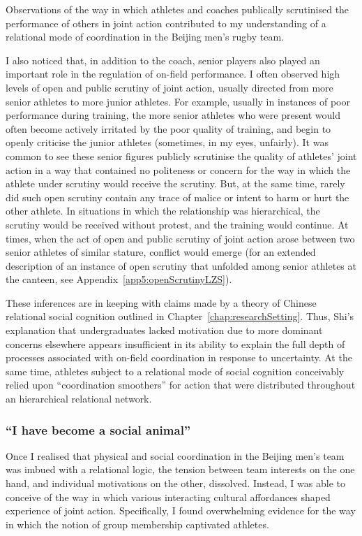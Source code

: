 \begin{CJK}{UTF8}{gbsn}
Observations of the way in which athletes and coaches publically  scrutinised the performance of others in joint action contributed to my understanding of a relational mode of coordination in the Beijing men's rugby team.

I also noticed that, in addition to the coach, senior players also played an important role in the regulation of on-field performance.
I often observed high levels of open and public scrutiny of joint action, usually directed from more senior athletes to more junior athletes.  For example, usually in instances of poor performance during training, the more senior athletes who were present would often become actively irritated by the poor quality of training, and begin to openly criticise the junior athletes (sometimes, in my eyes, unfairly).  It was common to see these senior figures publicly scrutinise the quality of athletes' joint action in a way that contained no politeness or concern for the way in which the athlete under scrutiny would receive the scrutiny. But, at the same time, rarely did such open scrutiny contain any trace of malice or intent to harm or hurt the other athlete. In situations in which the relationship was hierarchical, the scrutiny would be received without protest, and the training would continue.   At times, when the act of open and public scrutiny of joint action arose between two senior athletes of similar stature, conflict would emerge (for an extended description of an instance of open scrutiny that unfolded among senior athletes at the canteen, see Appendix~\ref{app5:openScrutinyLZS}).

These inferences are in keeping with claims made by a theory of Chinese relational social cognition outlined in Chapter~\ref{chap:researchSetting}.  Thus, Shi's explanation that undergraduates lacked motivation due to more dominant concerns elsewhere appears insufficient in its ability to explain the full depth of processes associated with on-field coordination in response to uncertainty.  At the same time, athletes subject to a relational mode of social cognition conceivably relied upon ``coordination smoothers'' for action that were distributed throughout an hierarchical relational network.



 \subsubsection{``I have become a social animal''\label{sect:socialAnimal}}
Once I realised that physical and social coordination in the Beijing men's team was imbued with a relational logic, the tension between team interests on the one hand, and individual motivations on the other, dissolved. Instead, I was able to conceive of the way in which various interacting cultural affordances shaped experience of joint action.  Specifically, I found overwhelming evidence for the way in which the notion of group membership captivated athletes.


\end{CJK}
